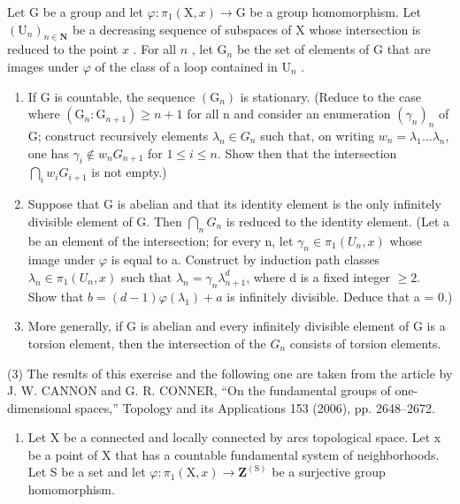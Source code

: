 Let G be a group and let \(\varphi\colon\pi_{1}(\mathrm{X},x)\to\mathrm{G}\) be a group homomorphism. Let \((\mathrm{U}_{n})_{n\in\mathbf{N}}\) be a decreasing sequence of subspaces of X whose intersection is reduced to the point \(x\) . For all \(n\) , let \(\mathrm{G}_{n}\) be the set of elements of G that are images under \(\varphi\) of the class of a loop contained in \(\mathrm{U}_{n}\) .

\begin{enumerate}
\def\labelenumi{\alph{enumi})}
\item
  If G is countable, the sequence \((\mathrm{G}_{n})\) is stationary. (Reduce to the case where \((\mathrm{G}_{n}:\mathrm{G}_{n+1})\geqslant n+1\) for all n and consider an enumeration \((\gamma_{n})_{n}\) of G; construct recursively elements \(\lambda_{n}\in G_{n}\) such that, on writing \(w_{n}=\lambda_{1}\ldots\lambda_{n}\), one has \(\gamma_{i}\notin w_{n}G_{n+1}\) for \(1\leqslant i\leqslant n\). Show then that the intersection \(\bigcap_{i}w_{i}G_{i+1}\) is not empty.)
\item
  Suppose that G is abelian and that its identity element is the only infinitely divisible element of G. Then \(\bigcap_{n} G_{n}\) is reduced to the identity element. (Let a be an element of the intersection; for every n, let \(\gamma_{n} \in \pi_{1}(U_{n}, x)\) whose image under \(\varphi\) is equal to a. Construct by induction path classes \(\lambda_{n} \in \pi_{1}(U_{n}, x)\) such that \(\lambda_{n} = \gamma_{n}\lambda_{n+1}^{d}\), where d is a fixed integer \(\geqslant 2\). Show that \(b = (d - 1)\varphi(\lambda_{1}) + a\) is infinitely divisible. Deduce that a = 0.)
\item
  More generally, if G is abelian and every infinitely divisible element of G is a torsion element, then the intersection of the \(G_{n}\) consists of torsion elements.
\end{enumerate}

(3) The results of this exercise and the following one are taken from the article by J. W. CANNON and G. R. CONNER, “On the fundamental groups of one-dimensional spaces,” Topology and its Applications 153 (2006), pp. 2648–2672.

\begin{enumerate}
\def\labelenumi{\arabic{enumi})}
\setcounter{enumi}{3}
\tightlist
\item
  Let X be a connected and locally connected by arcs topological space. Let x be a point of X that has a countable fundamental system of neighborhoods. Let S be a set and let \(\varphi\colon\pi_{1}(\mathrm{X},x)\to\mathbf{Z}^{(\mathrm{S})}\) be a surjective group homomorphism.
\end{enumerate}

